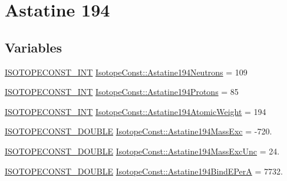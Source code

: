 \hypertarget{group___isotope_const-_astatine-_at194}{}\section{Astatine 194}
\label{group___isotope_const-_astatine-_at194}
\subsection*{Variables}
\begin{DoxyCompactItemize}
\item 
\mbox{\hyperlink{group___isotope_const-_macros_ga5f18360b3e99483a35c32d789e62621c}{I\+S\+O\+T\+O\+P\+E\+C\+O\+N\+S\+T\+\_\+\+I\+NT}} \mbox{\hyperlink{group___isotope_const-_astatine-_at194_gadd07bc461abf4e080521405602d0ff1b}{Isotope\+Const\+::\+Astatine194\+Neutrons}} = 109
\item 
\mbox{\hyperlink{group___isotope_const-_macros_ga5f18360b3e99483a35c32d789e62621c}{I\+S\+O\+T\+O\+P\+E\+C\+O\+N\+S\+T\+\_\+\+I\+NT}} \mbox{\hyperlink{group___isotope_const-_astatine-_at194_ga35e9fc7d7b391f08ea0c94e5321b7435}{Isotope\+Const\+::\+Astatine194\+Protons}} = 85
\item 
\mbox{\hyperlink{group___isotope_const-_macros_ga5f18360b3e99483a35c32d789e62621c}{I\+S\+O\+T\+O\+P\+E\+C\+O\+N\+S\+T\+\_\+\+I\+NT}} \mbox{\hyperlink{group___isotope_const-_astatine-_at194_ga4e602592a16d681912a24ee425e51888}{Isotope\+Const\+::\+Astatine194\+Atomic\+Weight}} = 194
\item 
\mbox{\hyperlink{group___isotope_const-_macros_ga8f45a7272ce02c0b4c65c44636ed719a}{I\+S\+O\+T\+O\+P\+E\+C\+O\+N\+S\+T\+\_\+\+D\+O\+U\+B\+LE}} \mbox{\hyperlink{group___isotope_const-_astatine-_at194_ga07e8f6492b30e92938248873e24a6b30}{Isotope\+Const\+::\+Astatine194\+Mass\+Exc}} = -\/720.
\item 
\mbox{\hyperlink{group___isotope_const-_macros_ga8f45a7272ce02c0b4c65c44636ed719a}{I\+S\+O\+T\+O\+P\+E\+C\+O\+N\+S\+T\+\_\+\+D\+O\+U\+B\+LE}} \mbox{\hyperlink{group___isotope_const-_astatine-_at194_ga4c3ebb5baf5d3c5bc0c0ffe1d40ed1fe}{Isotope\+Const\+::\+Astatine194\+Mass\+Exc\+Unc}} = 24.
\item 
\mbox{\hyperlink{group___isotope_const-_macros_ga8f45a7272ce02c0b4c65c44636ed719a}{I\+S\+O\+T\+O\+P\+E\+C\+O\+N\+S\+T\+\_\+\+D\+O\+U\+B\+LE}} \mbox{\hyperlink{group___isotope_const-_astatine-_at194_ga0167f6a9e7bb48dca7268b407504af98}{Isotope\+Const\+::\+Astatine194\+Bind\+E\+PerA}} = 7732.
\item 

\end{DoxyCompactItemize}
